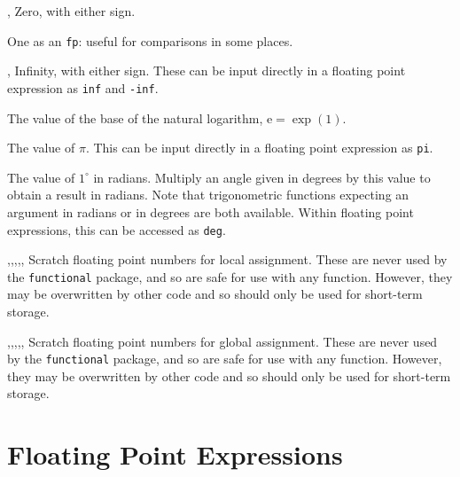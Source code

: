\documentclass[oneside]{book}
\begin{document}
\begin{variable}{\cZeroFp, \cMinusZeroFp}
Zero, with either sign.
\end{variable}

\begin{variable}{\cOneFp}
One as an \texttt{fp}: useful for comparisons in some places.
\end{variable}

\begin{variable}{\cInfFp,\cMinusInfFp}
Infinity, with either sign. These can be input directly in a
floating point expression as \texttt{inf} and \texttt{-inf}.
\end{variable}

\begin{variable}{\cEFp}
The value of the base of the natural logarithm, $\mathrm{e} = \exp(1)$.
\end{variable}

\begin{variable}{\cPiFp}
The value of $\pi$.  This can be input directly in a floating point
expression as \texttt{pi}.
\end{variable}

\begin{variable}{\cOneDegreeFp}
The value of $1^{\circ}$ in radians. Multiply an angle given in
degrees by this value to obtain a result in radians.  Note that
trigonometric functions expecting an argument in radians or in
degrees are both available.  Within floating point expressions, this
can be accessed as \texttt{deg}.
\end{variable}

\begin{variable}{\lTmpaFp,\lTmpbFp,\lTmpcFp,\lTmpiFp,\lTmpjFp,\lTmpkFp}
Scratch floating point numbers for local assignment. These are never used by
the \verb!functional! package, and so are safe for use with any
function. However, they may be overwritten by other
code and so should only be used for short-term storage.
\end{variable}

\begin{variable}{\gTmpaFp,\gTmpbFp,\gTmpcFp,\gTmpiFp,\gTmpjFp,\gTmpkFp}
Scratch floating point numbers for global assignment. These are never used by
the \verb!functional! package, and so are safe for use with any
function. However, they may be overwritten by other
code and so should only be used for short-term storage.
\end{variable}

\section{Floating Point Expressions}
\end{document}
